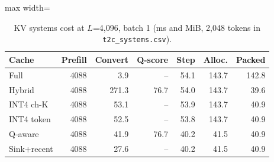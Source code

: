 \begin{table}[!htb]
\centering
\scriptsize
\setlength{\tabcolsep}{3.5pt}
\caption{KV systems cost at $L$=4,096, batch 1 (ms and MiB, 2,048 tokens in \texttt{t2c\_systems.csv}).}
\label{tab:t2csys4096}
\begin{adjustbox}{max width=\linewidth}
\begin{tabular}{lrrrrrr}
\toprule
Cache & Prefill & Convert & Q-score & Step & Alloc. & Packed \\
\midrule
Full & 4088 & 3.9 & -- & 54.1 & 143.7 & 142.8 \\
Hybrid & 4088 & 271.3 & 76.7 & 54.0 & 143.7 & 39.6 \\
INT4 ch-K & 4088 & 53.1 & -- & 53.9 & 143.7 & 40.9 \\
INT4 token & 4088 & 52.5 & -- & 53.8 & 143.7 & 40.9 \\
Q-aware & 4088 & 41.9 & 76.7 & 40.2 & 41.5 & 40.9 \\
Sink+recent & 4088 & 27.6 & -- & 40.2 & 41.5 & 40.9 \\
\bottomrule
\end{tabular}
\end{adjustbox}
\end{table}
